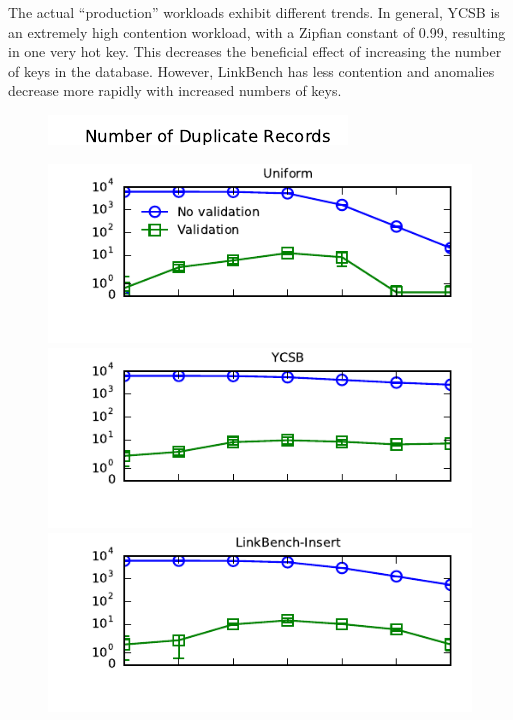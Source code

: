 The actual ``production'' workloads exhibit different trends. In
general, YCSB is an extremely high contention workload, with a Zipfian
constant of 0.99, resulting in one very hot key. This decreases the
beneficial effect of increasing the number of keys in the
database. However, LinkBench has less contention and anomalies decrease more
rapidly with increased numbers of keys.

\begin{figure}

\begin{minipage}[l]{0cm}
\includegraphics[angle=90, width=.185in]{figs/pk-workload-ylabel.pdf}
\end{minipage}
\begin{minipage}{\columnwidth}
\includegraphics[width=1\columnwidth]{figs/pk-workload-uniform-violations.pdf}\vspace{-2em}
\includegraphics[width=1\columnwidth]{figs/pk-workload-ycsb-violations.pdf}\vspace{-2em}
\includegraphics[width=1\columnwidth]{figs/pk-workload-linkbench-ins-violations.pdf}\vspace{-2em}

\end{minipage}
\end{figure}
